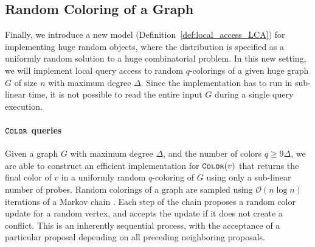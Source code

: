\subsection{Random Coloring of a Graph}
\label{sec:overview_random_coloring_of_a_graph}
Finally, we introduce a new model (Definition~\ref{def:local_access_LCA}) for implementing huge random objects,
where the distribution is specified as a uniformly random solution to a huge combinatorial problem.
In this new setting, we will implement local query access to random $q$-colorings of a given huge graph $G$ of size $n$ with maximum degree $\Delta$.
Since the implementation has to run in sub-linear time, it is not possible to read the entire input $G$ during a single query execution.


\paragraph*{$\texttt{\textsc{Color}}$ queries}
\label{par:color_queries}
Given a graph $G$ with maximum degree $\Delta$, and the number of colors $q\ge 9\Delta$,
we are able to construct an efficient implementation for $\texttt{\textsc{Color}}(v)$ that returns the final color of $v$
in a uniformly random $q$-coloring of $G$ using only a sub-linear number of probes.
Random colorings of a graph are sampled using $\mathcal O(n\log n)$ iterations of a Markov chain \cite{glauber_survey}.
Each step of the chain proposes a random color update for a random vertex, and accepts the update if it does not create a conflict.
This is an inherently sequential process, with the acceptance of a particular proposal depending on all preceding neighboring proposals.

